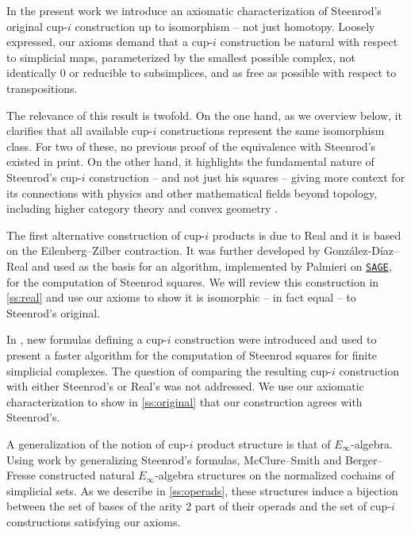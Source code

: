 In the present work we introduce an axiomatic characterization of Steenrod's original cup-$i$ construction up to isomorphism -- not just homotopy.
Loosely expressed, our axioms demand that a cup-$i$ construction be natural with respect to simplicial maps, parameterized by the smallest possible complex, not identically $0$ or reducible to subsimplices, and as free as possible with respect to transpositions.

The relevance of this result is twofold.
On the one hand, as we overview below, it clarifies that all available cup-$i$ constructions represent the same isomorphism class.
For two of these, no previous proof of the equivalence with Steenrod's existed in print.
On the other hand, it highlights the fundamental nature of Steenrod's \mbox{cup-$i$} construction -- and not just his squares -- giving more context for its connections with physics and other mathematical fields beyond topology, including higher category theory \cite{medina2020globular} and convex geometry \cite{medina2022fib_poly}.

The first alternative construction of \mbox{cup-$i$} products is due to Real \cite{real1996computability} and it is based on the Eilenberg--Zilber contraction.
It was further developed by Gonz\'alez-D\'iaz--Real \cite{gonzalez-diaz1999steenrod} and used as the basis for an algorithm, implemented by Palmieri on \href{https://www.sagemath.org/}{\texttt{SAGE}}, for the computation of Steenrod squares.
We will review this construction in \cref{ss:real} and use our axioms to show it is isomorphic -- in fact equal -- to Steenrod's original.

In \cite{medina2021fast_sq}, new formulas defining a \mbox{cup-$i$} construction were introduced and used to present a faster algorithm for the computation of Steenrod squares for finite simplicial complexes.
The question of comparing the resulting \mbox{cup-$i$} construction with either Steenrod's or Real's was not addressed.
We use our axiomatic characterization to show in \cref{ss:original} that our construction agrees with Steenrod's.

A generalization of the notion of \mbox{cup-$i$} product structure is that of $E_\infty$-algebra.
Using work by \cite[]{benson1998representations} generalizing Steenrod's formulas, McClure--Smith \cite{mcclure2003multivariable} and Berger--Fresse \cite{berger2004combinatorial} constructed natural $E_\infty$-algebra structures on the normalized cochains of simplicial sets.
As we describe in \cref{ss:operads}, these structures induce a bijection between the set of bases of the arity 2 part of their operads and the set of \mbox{cup-$i$} constructions satisfying our axioms.

